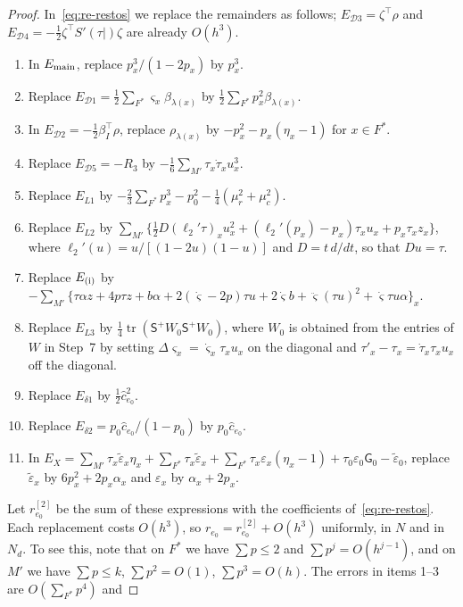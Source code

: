 \begin{proof}
In~\eqref{eq:re-restos} we replace the remainders as follows; $E_{\mathcal D3}=\zeta^\top\rho$ and
$E_{\mathcal D4}=-\tfrac12\zeta^\top S'(\tau|)\zeta$ are already $O(h^3)$.
\begin{enumerate}
\item In $E_{\rm main}$, replace $p_x^3/(1-2p_x)$ by $p_x^3$.
\item Replace $E_{\mathcal D1}=\tfrac12\sum_{F^*}\varsigma_x\beta_{\lambda(x)}$ by
$\tfrac12\sum_{F^*}p_x^2\beta_{\lambda(x)}$.
\item In $E_{\mathcal D2}=-\tfrac12\beta_I^\top\rho$, replace $\rho_{\lambda(x)}$ by
$-p_x^2-p_x(\eta_x-1)$ for $x\in F^*$.
\item Replace $E_{\mathcal D5}=-R_3$ by $-\tfrac16\sum_{M'}\tau_x\dot\tau_xu_x^3$.
\item Replace $E_{L1}$ by $-\tfrac23\sum_{F^*}p_x^3-p_0^2-\tfrac14(\mu_r^2+\mu_c^2)$.
\item Replace $E_{L2}$ by $\sum_{M'}\bigl\{\tfrac12D(\ell_2'\tau)_xu_x^2
+(\ell_2'(p_x)-p_x)\tau_xu_x+p_x\tau_xz_x\bigr\}$, where $\ell_2'(u)=u/[(1-2u)(1-u)]$ and
$D=t\,d/dt$, so that $Du=\tau$.
\item Replace $E_{\rm(i)}$ by $-\sum_{M'}\bigl\{\tau\alpha z+4p\tau z+b\alpha
+2(\dot\varsigma-2p)\tau u+2\dot\varsigma b+\ddot\varsigma(\tau u)^2+\dot\varsigma\tau u\alpha\bigr\}_x$.
\item Replace $E_{L3}$ by $\tfrac14\operatorname{tr}(\mathsf S^+W_0\mathsf S^+W_0)$, where $W_0$ is
obtained from the entries of $W$ in Step~7 by setting $\Delta\varsigma_x=\dot\varsigma_x\tau_xu_x$ on the
diagonal and $\tau'_x-\tau_x=\dot\tau_x\tau_xu_x$ off the diagonal.
\item Replace $E_{\delta1}$ by $\tfrac12\hat c_{e_0}^2$.
\item Replace $E_{\delta2}=p_0\hat c_{e_0}/(1-p_0)$ by $p_0\hat c_{e_0}$.
\item In
$E_X=\sum_{M'}\tau_x\tilde\varepsilon_x\eta_x+\sum_{F^*}\tau_x\tilde\varepsilon_x
+\sum_{F^*}\tau_x\varepsilon_x(\eta_x-1)+\tau_0\varepsilon_0\mathsf G_0-\tilde\varepsilon_0$, replace
$\tilde\varepsilon_x$ by $6p_x^2+2p_x\alpha_x$ and $\varepsilon_x$ by $\alpha_x+2p_x$.
\end{enumerate}
Let $r^{[2]}_{e_0}$ be the sum of these expressions with the coefficients of~\eqref{eq:re-restos}. Each
replacement costs $O(h^3)$, so $r_{e_0}=r^{[2]}_{e_0}+O(h^3)$ uniformly, in $N$ and in $N_d$. To see this,
note that on $F^*$ we have $\sum p\le2$ and $\sum p^j=O(h^{j-1})$, and on $M'$ we have $\sum p\le k$,
$\sum p^2=O(1)$, $\sum p^3=O(h)$. The errors in items 1--3 are $O(\sum_{F^*}p^4)$ and

\end{proof}
